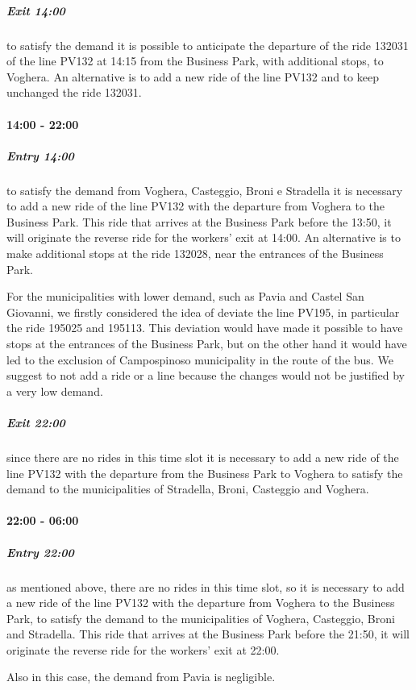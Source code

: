 \subparagraph{Exit 14:00} to satisfy the demand it is possible to anticipate the departure of the ride 132031 of the line PV132 at 14:15 from the Business Park, with additional stops, to Voghera.
An alternative is to add a new ride of the line PV132 and to keep unchanged the ride 132031.

\paragraph{14:00 - 22:00}

\subparagraph{Entry 14:00} to satisfy the demand from Voghera, Casteggio, Broni e Stradella it is necessary to add a new ride of the line PV132 with the departure from Voghera to the Business Park. This ride that arrives at the Business Park before the 13:50, it will originate the reverse ride for the workers’ exit at 14:00.
An alternative is to make additional stops at the ride 132028, near the entrances of the Business Park.

For the municipalities with lower demand, such as Pavia and Castel San Giovanni, we firstly considered the idea of deviate the line PV195, in particular the ride 195025 and 195113. This deviation would have made it possible to have stops at the entrances of the Business Park, but on the other hand it would have led to the exclusion of Campospinoso municipality in the route of the bus. We suggest to not add a ride or a line because the changes would not be justified by a very low demand.

\subparagraph{Exit 22:00} since there are no rides in this time slot it is necessary to add a new ride of the line PV132 with the departure from the Business Park to Voghera to satisfy the demand to the municipalities of Stradella, Broni, Casteggio and Voghera.

\paragraph{22:00 - 06:00}

\subparagraph{Entry 22:00} as mentioned above, there are no rides in this time slot, so it is necessary to add a new ride of the line PV132 with the departure from Voghera to the Business Park, to satisfy the demand to the municipalities of Voghera, Casteggio, Broni and Stradella. This ride that arrives at the Business Park before the 21:50, it will originate the reverse ride for the workers’ exit at 22:00.

Also in this case, the demand from Pavia is negligible.

